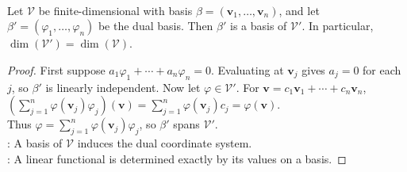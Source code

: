 \begin{theorem} \label{thm:dual-basis-and-dimension} \\
Let $\mathcal{V}$ be finite-dimensional with basis $\beta=(\mathbf{v}_1,\ldots,\mathbf{v}_n)$, and let $\beta'=(\varphi_1,\ldots,\varphi_n)$ be the dual basis. Then $\beta'$ is a basis of $\mathcal{V}'$. In particular, $\dim(\mathcal{V}')=\dim(\mathcal{V})$.
\begin{proof}
First suppose $a_1\varphi_1+\cdots+a_n\varphi_n=0$. Evaluating at $\mathbf{v}_j$ gives $a_j=0$ for each $j$, so $\beta'$ is linearly independent. Now let $\varphi\in\mathcal{V}'$. For $\mathbf{v}=c_1\mathbf{v}_1+\cdots+c_n\mathbf{v}_n$, $\left(\sum\limits_{j=1}^n \varphi(\mathbf{v}_j)\varphi_j\right)(\mathbf{v}) =\sum\limits_{j=1}^n \varphi(\mathbf{v}_j)c_j =\varphi(\mathbf{v})$.\\
Thus $\varphi=\sum_{j=1}^n \varphi(\mathbf{v}_j)\varphi_j$, so $\beta'$ spans $\mathcal{V}'$.\\
: A basis of $\mathcal{V}$ induces the dual coordinate system.\\
: A linear functional is determined exactly by its values on a basis.
\end{proof}
\end{theorem}


